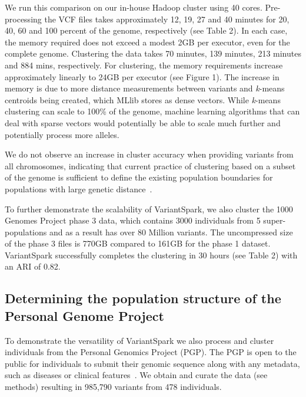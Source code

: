\documentclass{bmcart}
\newcommand{\variantSpark}{{\sc VariantSpark}}
\newcommand{\kMeans}{\textit{k}-means}
\begin{document}
We run this comparison on our in-house Hadoop cluster using 40 cores.
Pre-processing the VCF files takes approximately 12, 19, 27 and 40 minutes for 20, 40, 60 and 100 percent of the genome, respectively (see Table 2).
In each case, the memory required does not exceed a modest 2GB per executor, even for the complete genome. 
Clustering the data takes 70 minutes, 139 minutes, 213 minutes and 884 mins, respectively.
For clustering, the memory requirements increase approximately linearly to 24GB per executor (see Figure 1). 
The increase in memory is due to more distance measurements between variants and \kMeans{} centroids being created, which MLlib stores as dense vectors. 
While \kMeans{} clustering can scale to 100\% of the genome, machine learning algorithms that can deal with sparse vectors would potentially be able to scale much further and potentially process more alleles.

We do not observe an increase in cluster accuracy when providing variants from all chromosomes, indicating that current practice of clustering based on a subset of the genome is sufficient to define the existing population boundaries for populations with large genetic distance~\cite{Pugach2015}.

To further demonstrate the scalability of \variantSpark{}, we also cluster the 1000 Genomes Project phase 3 data, which contains 3000 individuals from 5 super-populations and as a result has over 80 Million variants. 
The uncompressed size of the phase 3 files is 770GB compared to 161GB for the phase 1 dataset.
\variantSpark{} successfully completes the clustering in 30 hours (see Table 2) with an ARI of 0.82. 



\subsection*{Determining the population structure of the Personal Genome Project}
To demonstrate the versatility of \variantSpark{} we also process and cluster individuals from the Personal Genomics Project (PGP). The PGP is open to the public for individuals to submit their genomic sequence along with any metadata, such as diseases or clinical features~\cite{Lunshof2013}. 
We obtain and curate the data (see methods) resulting in 985,790 variants from 478 individuals.
\end{document}
